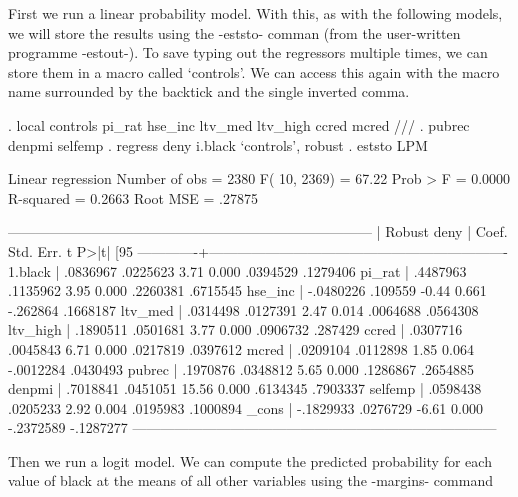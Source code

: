 \documentclass{scrartcl}
\begin{document}
First we run a linear probability model. With this, as with the following models, we will store the results using the -eststo- comman (from the user-written programme -estout-). To save typing out the regressors multiple times, we can store them in a macro called `controls'. We can access this again with the macro name surrounded by the backtick and the single inverted comma.

\begin{SinputC}
. local controls pi_rat hse_inc ltv_med ltv_high ccred mcred ///
. 	pubrec denpmi selfemp
. regress deny i.black `controls', robust
. eststo LPM
\end{SinputC}
\begin{SoutputC}
Linear regression                                      Number of obs =    2380
                                                       F( 10,  2369) =   67.22
                                                       Prob > F      =  0.0000
                                                       R-squared     =  0.2663
                                                       Root MSE      =  .27875

------------------------------------------------------------------------------
             |               Robust
        deny |      Coef.   Std. Err.      t    P>|t|     [95%
-------------+----------------------------------------------------------------
     1.black |   .0836967   .0225623     3.71   0.000     .0394529    .1279406
      pi_rat |   .4487963   .1135962     3.95   0.000     .2260381    .6715545
     hse_inc |  -.0480226    .109559    -0.44   0.661     -.262864    .1668187
     ltv_med |   .0314498   .0127391     2.47   0.014     .0064688    .0564308
    ltv_high |   .1890511   .0501681     3.77   0.000     .0906732     .287429
       ccred |   .0307716   .0045843     6.71   0.000     .0217819    .0397612
       mcred |   .0209104   .0112898     1.85   0.064    -.0012284    .0430493
      pubrec |   .1970876   .0348812     5.65   0.000     .1286867    .2654885
      denpmi |   .7018841   .0451051    15.56   0.000     .6134345    .7903337
     selfemp |   .0598438   .0205233     2.92   0.004     .0195983    .1000894
       _cons |  -.1829933   .0276729    -6.61   0.000    -.2372589   -.1287277
------------------------------------------------------------------------------
\end{SoutputC}

Then we run a logit model. We can compute the predicted probability for each value of black at the means of all other variables using the -margins- command
\end{document}
